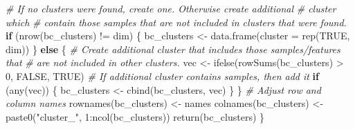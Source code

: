 \documentclass[
]{book}
\newenvironment{Shaded}{\begin{snugshade}}{\end{snugshade}}
\newcommand{\AttributeTok}[1]{\textcolor[rgb]{0.77,0.63,0.00}{#1}}
\newcommand{\CommentTok}[1]{\textcolor[rgb]{0.56,0.35,0.01}{\textit{#1}}}
\newcommand{\ConstantTok}[1]{\textcolor[rgb]{0.00,0.00,0.00}{#1}}
\newcommand{\ControlFlowTok}[1]{\textcolor[rgb]{0.13,0.29,0.53}{\textbf{#1}}}
\newcommand{\DecValTok}[1]{\textcolor[rgb]{0.00,0.00,0.81}{#1}}
\newcommand{\FunctionTok}[1]{\textcolor[rgb]{0.00,0.00,0.00}{#1}}
\newcommand{\NormalTok}[1]{#1}
\newcommand{\OtherTok}[1]{\textcolor[rgb]{0.56,0.35,0.01}{#1}}
\newcommand{\SpecialCharTok}[1]{\textcolor[rgb]{0.00,0.00,0.00}{#1}}
\newcommand{\StringTok}[1]{\textcolor[rgb]{0.31,0.60,0.02}{#1}}
\begin{document}
\begin{Shaded}
\begin{Highlighting}[]
  \CommentTok{\# If no clusters were found, create one. Otherwise create additional}
  \CommentTok{\# cluster which}
  \CommentTok{\# contain those samples that are not included in clusters that were found.}
  \ControlFlowTok{if}\NormalTok{ (}\FunctionTok{nrow}\NormalTok{(bc\_clusters) }\SpecialCharTok{!=}\NormalTok{ dim) \{}
\NormalTok{    bc\_clusters }\OtherTok{\textless{}{-}} \FunctionTok{data.frame}\NormalTok{(}\AttributeTok{cluster =} \FunctionTok{rep}\NormalTok{(}\ConstantTok{TRUE}\NormalTok{, dim))}
\NormalTok{  \} }\ControlFlowTok{else}\NormalTok{ \{}
    \CommentTok{\# Create additional cluster that includes those samples/features that}
    \CommentTok{\# are not included in other clusters.}
\NormalTok{    vec }\OtherTok{\textless{}{-}} \FunctionTok{ifelse}\NormalTok{(}\FunctionTok{rowSums}\NormalTok{(bc\_clusters) }\SpecialCharTok{\textgreater{}} \DecValTok{0}\NormalTok{, }\ConstantTok{FALSE}\NormalTok{, }\ConstantTok{TRUE}\NormalTok{)}
    \CommentTok{\# If additional cluster contains samples, then add it}
    \ControlFlowTok{if}\NormalTok{ (}\FunctionTok{any}\NormalTok{(vec)) \{}
\NormalTok{      bc\_clusters }\OtherTok{\textless{}{-}} \FunctionTok{cbind}\NormalTok{(bc\_clusters, vec)}
\NormalTok{    \}}
\NormalTok{  \}}
  \CommentTok{\# Adjust row and column names}
  \FunctionTok{rownames}\NormalTok{(bc\_clusters) }\OtherTok{\textless{}{-}}\NormalTok{ names}
  \FunctionTok{colnames}\NormalTok{(bc\_clusters) }\OtherTok{\textless{}{-}} \FunctionTok{paste0}\NormalTok{(}\StringTok{"cluster\_"}\NormalTok{, }\DecValTok{1}\SpecialCharTok{:}\FunctionTok{ncol}\NormalTok{(bc\_clusters))}
  \FunctionTok{return}\NormalTok{(bc\_clusters)}
\NormalTok{\}}
\end{Highlighting}
\end{Shaded}

\begin{Shaded}
\end{Shaded}
\end{document}
